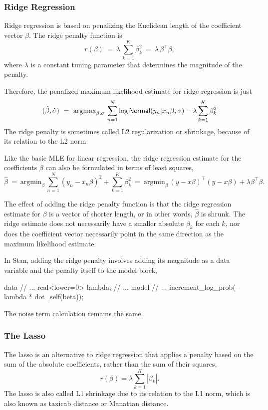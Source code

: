 \subsubsection{Ridge Regression}

Ridge regression \citep{HoerlKennard:1970} is based on penalizing the
Euclidean length of the coefficient vector $\beta$. The ridge penalty
function is
%
\[
r(\beta) 
\ = \
\lambda \, \sum_{k=1}^K \beta_k^2
\ = \ 
\lambda \, \beta^{\top} \beta,
\]
%
where $\lambda$ is a constant tuning parameter that determines the
magnitude of the penalty. 


Therefore, the penalized maximum likelihood estimate for ridge
regression is just
%
\[
(\hat{\beta},\hat{\sigma}) 
\ = \
\mbox{argmax}_{\beta,\sigma} \,
 \sum_{n=1}^N \log \distro{Normal}(y_n|x_n \beta, \sigma) - \lambda
 \sum_{k=1}^K \beta_k^2
\]
%
The ridge penalty is sometimes called L2 regularization or shrinkage,
because of its relation to the L2 norm.

Like the basic MLE for linear regression, the ridge regression
estimate for the coefficients $\beta$ can also be formulated in terms
of least squares,
%
\[
\hat{\beta}
\ = \ 
\mbox{argmin}_{\beta} \, \sum_{n=1}^N (y_n - x_n \beta)^2 + \sum_{k=1}^K \beta_k^2
\ = \ 
\mbox{argmin}_{\beta} \, (y - x\beta)^{\top} (y - x\beta) +
\lambda \beta^{\top} \beta.
\]

The effect of adding the ridge penalty function is that the ridge
regression estimate for $\beta$ is a vector of shorter length, or in
other words, $\hat{\beta}$ is shrunk.  The ridge estimate does not
necessarily have a smaller absolute $\beta_k$ for each $k$, nor does
the coefficient vector necessarily point in the same direction as the
maximum likelihood estimate.

In Stan, adding the ridge penalty involves adding its magnitude as a
data variable and the penalty itself to the model block,
%
\begin{stancode}
data {
  // ...
  real<lower=0> lambda;
}
// ...
model {
  // ...
  increment_log_prob(- lambda * dot_self(beta));
}
\end{stancode}
%
The noise term calculation remains the same.

\subsubsection{The Lasso}

The lasso \citep{Tibshirani:1996} is an alternative to ridge
regression that applies a penalty based on the sum of the absolute
coefficients, rather than the sum of their squares,
\[
r(\beta) = \lambda \sum_{k=1}^K | \beta_k |.
\]
The lasso is also called L1 shrinkage due to its relation to the L1
norm, which is also known as taxicab distance or Manattan distance.

